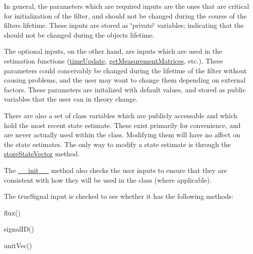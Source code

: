 In general, the parameters which are required inputs are the ones that are critical for initialization of the filter, and should not be changed during the course of the filter\textquotesingle{}s lifetime. These inputs are stored as \char`\"{}private\char`\"{} variables; indicating that the should not be changed during the object\textquotesingle{}s lifetime.

The optional inputs, on the other hand, are inputs which are used in the estimation functions (\hyperlink{classmodest_1_1substates_1_1correlationvector_1_1CorrelationVector_a59c13e5fa26ba27717494f687ec78ef8}{time\+Update}, \hyperlink{classmodest_1_1substates_1_1correlationvector_1_1CorrelationVector_a2fb13d8c6fffa49ee641dd918a64db4b}{get\+Measurement\+Matrices}, etc.). These parameters could conceivably be changed during the lifetime of the filter without causing problems, and the user may want to change them depending on external factors. These parameters are initalized with default values, and stored as public variables that the user can in theory change.

There are also a set of class variables which are publicly accessable and which hold the most recent state estimate. These exist primarily for convenience, and are never actually used within the class. Modifying them will have no affect on the state estimates. The only way to modify a state estimate is through the \hyperlink{classmodest_1_1substates_1_1correlationvector_1_1CorrelationVector_a70ed47697f09424e62e52133fdfb59de}{store\+State\+Vector} method.

The \hyperlink{classmodest_1_1substates_1_1correlationvector_1_1CorrelationVector_a094103eb6a6bf7bbc118f86f03e1c885}{\+\_\+\+\_\+init\+\_\+\+\_\+} method also checks the user inputs to ensure that they are consistent with how they will be used in the class (where applicable).

The true\+Signal input is checked to see whether it has the following methods\+:
\begin{DoxyItemize}
\item flux()
\item signal\+I\+D()
\item unit\+Vec()
\end{DoxyItemize}


